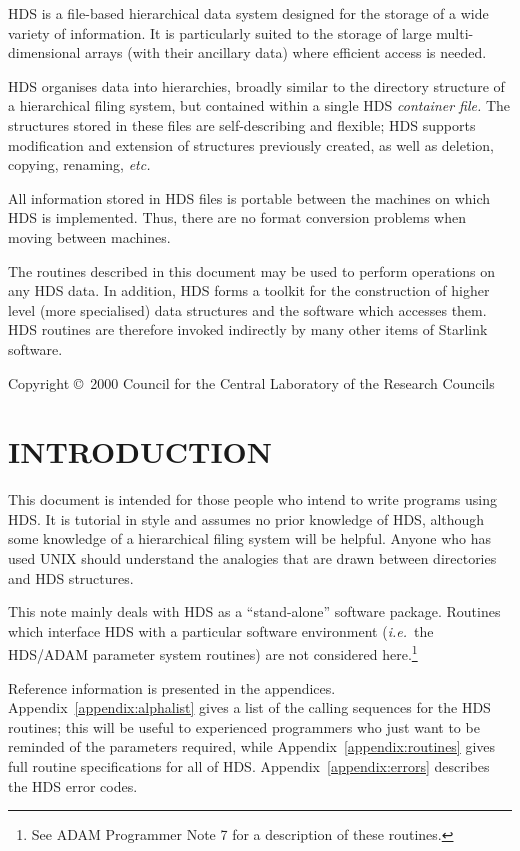 \documentclass[twoside,11pt]{article}
\newcommand{\stardocinitials}  {SUN}
\newcommand{\stardoccopyright} 
{Copyright \copyright\ 2000 Council for the Central Laboratory of the Research Councils}
\newcommand{\stardocnumber}    {92.12}
\newcommand{\stardocabstract}  {
HDS is a file-based hierarchical data system designed for the storage
of a wide variety of information. It is particularly suited to the
storage of large multi-dimensional arrays (with their ancillary data)
where efficient access is needed.

HDS organises data into \htmlref{hierarchies}{fig:hierarchy}, broadly
similar to the directory structure of a hierarchical filing system,
but contained within a single HDS \st{container file.} The structures
stored in these files are self-describing and flexible; HDS supports
modification and extension of structures previously created, as well
as deletion, copying, renaming, \st{etc.}

All information stored in HDS files is portable between the machines
on which HDS is implemented. Thus, there are no format conversion
problems when moving between machines.

The \htmlref{routines}{appendix:alphalist} described in this document
may be used to perform operations on any HDS data. In addition, HDS
forms a toolkit for the construction of higher level (more
specialised) data structures and the software which accesses them.
HDS routines are therefore invoked indirectly by many other items of
Starlink software.
}
\newcommand{\stardocname}{\stardocinitials /\stardocnumber}
\newcommand{\htmlref}[2]{#1}
\newenvironment{latexonly}{}{}
\newcommand{\xref}[3]{#1}
\newcommand{\xlabel}[1]{}
\renewcommand{\_}{\texttt{\symbol{95}}}
\newcommand{\qt}[1]{``#1''}
\newcommand{\st}[1]{{\em{#1}}}
\newcommand{\qt}[1]{{\tt{"}}#1{\tt{"}}}
\renewcommand{\thepage}{\roman{page}}
\begin{document}
\stardocabstract

\begin{latexonly}
\newpage
\vspace*{\fill}
\stardoccopyright
\end{latexonly}

  \newpage
  \begin{latexonly}
    \setlength{\parskip}{0mm}
    \tableofcontents
    \setlength{\parskip}{\medskipamount}
    \markboth{\stardocname}{\stardocname}
  \end{latexonly}

\cleardoublepage
\renewcommand{\thepage}{\arabic{page}}
\setcounter{page}{1}
\section {\xlabel{introduction}INTRODUCTION}

This document is intended for those people who intend to write
programs using HDS. It is tutorial in style and assumes no prior
knowledge of HDS, although some knowledge of a hierarchical filing
system will be helpful. Anyone who has used UNIX should understand the
analogies that are drawn between directories and HDS structures.

This note mainly deals with HDS as a \qt{stand-alone} software
package. Routines which interface HDS with a particular software
environment (\st{i.e.}\ the HDS/\xref{ADAM}{sg4}{} parameter system
routines) are not considered here.\footnote{See ADAM Programmer Note 7
for a description of these routines.}

Reference information is presented in the appendices.
Appendix~\ref{appendix:alphalist} gives a list of the calling
sequences for the HDS routines; this will be useful to experienced
programmers who just want to be reminded of the parameters required,
while Appendix~\ref{appendix:routines} gives full routine
specifications for all of HDS.  Appendix~\ref{appendix:errors}
describes the HDS error codes.
\end{document}
